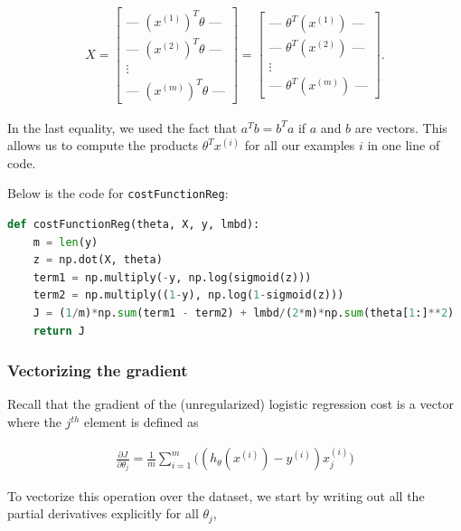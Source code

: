 \documentclass[12pt]{article}
\begin{document}
\begin{align}
  \mathbf {}X = \begin{bmatrix} \text{--- }(x^{(1)})^T\theta \text{ ---} \\ \text{--- }(x^{(2)})^T\theta \text{ ---} \\ \vdots \\ \text{--- }(x^{(m)})^T\theta \text{ ---} \end{bmatrix} = \begin{bmatrix} \text{--- }\theta^T(x^{(1)}) \text{ ---} \\ \text{--- }\theta^T(x^{(2)}) \text{ ---} \\ \vdots \\ \text{--- }\theta^T(x^{(m)}) \text{ ---} \end{bmatrix} .
\end{align}

In the last equality, we used the fact that $a^Tb = b^Ta$ if $a$ and $b$ are vectors. This allows us to compute the products $\theta^Tx^{(i)}$ for all our examples $i$ in one line of code.

Below is the code for \texttt{costFunctionReg}:

\begin{lstlisting}[language=Python]
  def costFunctionReg(theta, X, y, lmbd):
    m = len(y)
    z = np.dot(X, theta)
    term1 = np.multiply(-y, np.log(sigmoid(z)))
    term2 = np.multiply((1-y), np.log(1-sigmoid(z)))
    J = (1/m)*np.sum(term1 - term2) + lmbd/(2*m)*np.sum(theta[1:]**2)
    return J
\end{lstlisting}

\subsubsection{Vectorizing the gradient}

Recall that the gradient of the (unregularized) logistic regression cost is a vector where the $j^{th}$ element is defined as

\begin{align}
  \frac{\partial J}{\partial \theta_j} = \frac{1}{m}\sum_{i=1}^m{\big((h_\theta(x^{(i)})-y^{(i)})x_j^{(i)}\big)}
\end{align}

To vectorize this operation over the dataset, we start by writing out all the partial derivatives explicitly for all $\theta_j$,
\end{document}
